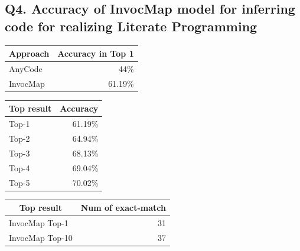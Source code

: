 \documentclass[sigconf,review,anonymous]{article}
\begin{document}
\subsection{Q4. Accuracy of InvocMap model for inferring code for realizing Literate Programming}

\begin{table}[]
\centering
\begin{tabular}{|l|r|}
\hline
\multicolumn{1}{|c|}{\textbf{Approach}} & \multicolumn{1}{c|}{\textbf{Accuracy in Top 1}} \\ \hline
AnyCode                                 & 44\%                                            \\ \hline
InvocMap                                & 61.19\%                                         \\ \hline
\end{tabular}
\end{table}

\begin{table}[]
\centering
\begin{tabular}{|l|r|}
\hline
\multicolumn{1}{|c|}{\textbf{Top result}} & \multicolumn{1}{c|}{\textbf{Accuracy}} \\ \hline
Top-1                                     & 61.19\%                                \\ \hline
Top-2                                     & 64.94\%                                \\ \hline
Top-3                                     & 68.13\%                                \\ \hline
Top-4                                     & 69.04\%                                \\ \hline
Top-5                                     & 70.02\%                                \\ \hline
\end{tabular}
\end{table}

\begin{table}[]
\centering
\begin{tabular}{|l|r|}
\hline
\multicolumn{1}{|c|}{\textbf{Top result}} & \multicolumn{1}{c|}{\textbf{Num of exact-match}} \\ \hline
InvocMap Top-1                            & 31                                               \\ \hline
InvocMap Top-10                           & 37                                               \\ \hline
\end{tabular}
\end{table}
\end{document}

